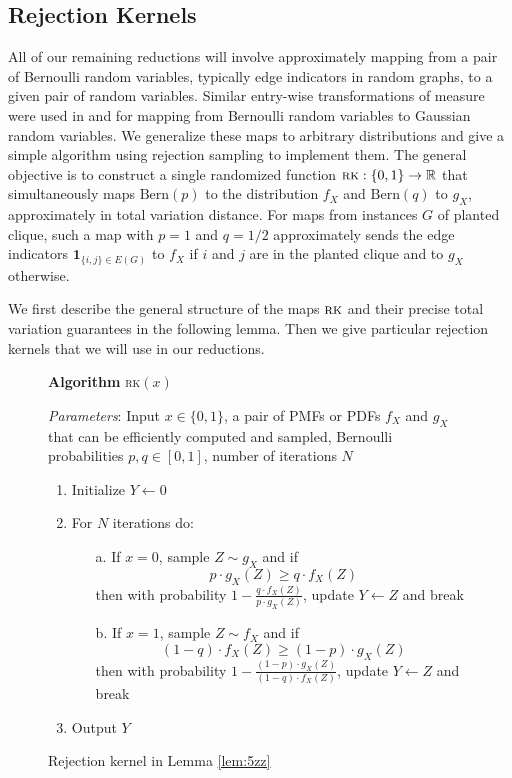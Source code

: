 
\subsection{Rejection Kernels}

All of our remaining reductions will involve approximately mapping from a pair of Bernoulli random variables, typically edge indicators in random graphs, to a given pair of random variables. Similar entry-wise transformations of measure were used in \cite{ma2015computational} and \cite{gao2017sparse} for mapping from Bernoulli random variables to Gaussian random variables. We generalize these maps to arbitrary distributions and give a simple algorithm using rejection sampling to implement them. The general objective is to construct a single randomized function $\textsc{rk} : \{0, 1\} \to \mathbb{R}$ that simultaneously maps $\text{Bern}(p)$ to the distribution $f_X$ and $\text{Bern}(q)$ to $g_X$, approximately in total variation distance. For maps from instances $G$ of planted clique, such a map with $p = 1$ and $q = 1/2$ approximately sends the edge indicators $\mathbf{1}_{\{ i, j \} \in E(G)}$ to $f_X$ if $i$ and $j$ are in the planted clique and to $g_X$ otherwise.

We first describe the general structure of the maps $\textsc{rk}$ and their precise total variation guarantees in the following lemma. Then we give particular rejection kernels that we will use in our reductions.

\begin{figure}[t!]
\begin{algbox}
\textbf{Algorithm} \textsc{rk}$(x)$

\vspace{2mm}

\textit{Parameters}: Input $x \in \{0, 1\}$, a pair of PMFs or PDFs $f_X$ and $g_X$ that can be efficiently computed and sampled, Bernoulli probabilities $p, q \in [0, 1]$, number of iterations $N$
\begin{enumerate}
\item Initialize $Y \gets 0$
\item For $N$ iterations do:
\begin{enumerate}
\item[a.] If $x = 0$, sample $Z \sim g_X$ and if
$$p \cdot g_X(Z) \ge q \cdot f_X(Z)$$
then with probability $1 - \frac{q \cdot f_X(Z)}{p \cdot g_X(Z)}$, update $Y \gets Z$ and break
\item[b.] If $x = 1$, sample $Z \sim f_X$ and if
$$(1 - q) \cdot f_X(Z) \ge (1 - p) \cdot g_X(Z)$$
then with probability $1 - \frac{(1 - p) \cdot g_X(Z)}{(1 - q) \cdot f_X(Z)}$, update $Y \gets Z$ and break
\end{enumerate}
\item Output $Y$
\end{enumerate}
\vspace{1mm}
\end{algbox}
\caption{Rejection kernel in Lemma \ref{lem:5zz}}
\label{fig:rej-kernel}
\end{figure}

